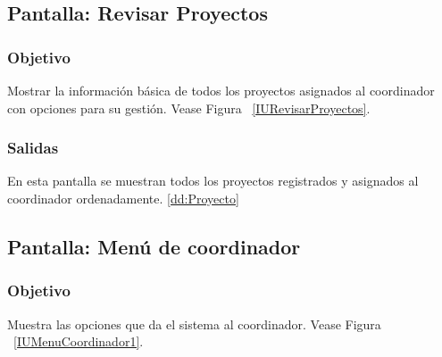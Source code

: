 \subsection{Pantalla: Revisar Proyectos}
\subsubsection{Objetivo}

Mostrar la información básica de todos los proyectos asignados al coordinador con opciones para su gestión. Vease Figura ~\ref{IURevisarProyectos}.

 
\subsubsection{Salidas}
En esta pantalla se muestran todos los proyectos registrados y asignados al coordinador ordenadamente. \ref{dd:Proyecto}
% 
% 


\subsection{Pantalla: Menú de coordinador}
\subsubsection{Objetivo}
Muestra las opciones que da el sistema al coordinador. Vease Figura ~\ref{IUMenuCoordinador1}.


